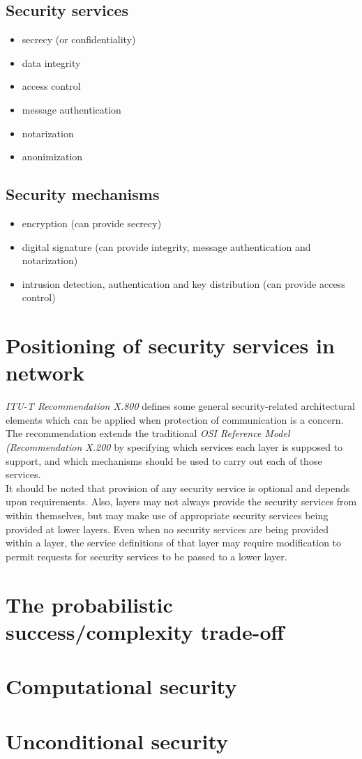 \subsection*{Security services}
\begin{itemize}
  \item secrecy (or confidentiality)
  \item data integrity
  \item access control
  \item message authentication
  \item notarization
  \item anonimization
\end{itemize}

\subsection*{Security mechanisms}
\begin{itemize}
  \item encryption (can provide secrecy)
  \item digital signature (can provide integrity, message authentication and
    notarization)
  \item intrusion detection, authentication and key distribution (can provide
    access control)
\end{itemize}

\section{Positioning of security services in network}
\textit{ITU-T Recommendation X.800} defines some general security-related architectural
elements which can be applied when protection of communication is a concern.\\
The recommendation extends the traditional \textit{OSI Reference Model
(Recommendation X.200} by specifying which services each layer is supposed to
support, and which mechanisms should be used to carry out each of those
services.\\
It should be noted that provision of any security service is optional and
depends upon requirements. Also, layers may not always provide the security
services from within themselves, but may make use of appropriate security
services being provided at lower layers. Even when no security services are
being provided within a layer, the service definitions of that layer may
require modification to permit requests for security services to be passed to a
lower layer.

\section{The probabilistic success/complexity trade-off} 
\section{Computational security}
\section{Unconditional security}
